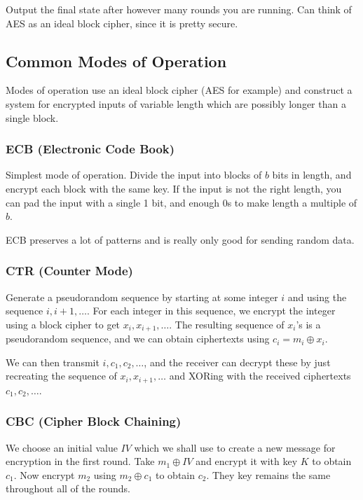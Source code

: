 \documentclass[psamsfonts]{amsart}
\begin{document}
Output the final state after however many rounds you are running. Can think of AES as an ideal block cipher, since it is pretty secure.

\subsection{Common Modes of Operation}

Modes of operation use an ideal block cipher (AES for example) and construct a system for encrypted inputs of variable length which are possibly longer than a single block.

\subsubsection{ECB (Electronic Code Book)}

Simplest mode of operation. Divide the input into blocks of $b$ bits in length, and encrypt each block with the same key. If the input is not the right length, you can pad the input with a single 1 bit, and enough 0s to make length a multiple of $b$.

ECB preserves a lot of patterns and is really only good for sending random data.

\subsubsection{CTR (Counter Mode)}

Generate a pseudorandom sequence by starting at some integer $i$ and using the sequence $i, i+1, \ldots$. For each integer in this sequence, we encrypt the integer using a block cipher to get $x_i, x_{i+1}, \ldots$. The resulting sequence of $x_i$'s is a pseudorandom sequence, and we can obtain ciphertexts using $c_i = m_i \oplus x_i$.

We can then transmit $i, c_1, c_2, \ldots$, and the receiver can decrypt these by just recreating the sequence of $x_i, x_{i+1}, \ldots$ and XORing with the received ciphertexts $c_1, c_2, \ldots$.

\subsubsection{CBC (Cipher Block Chaining)}

We choose an initial value $IV$ which we shall use to create a new message for encryption in the first round. Take $m_1 \oplus IV$ and encrypt it with key $K$ to obtain $c_1$. Now encrypt $m_2$ using $m_2 \oplus c_1$ to obtain $c_2$. They key remains the same throughout all of the rounds.
\end{document}
